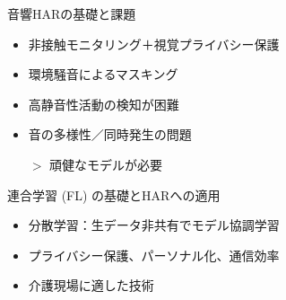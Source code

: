 \documentclass[unicode,12pt,aspectratio=169,dvipdfmx]{beamer}
\begin{document}
\begin{frame}{音響HARの基礎と課題}
  \begin{itemize}
    \item 非接触モニタリング＋視覚プライバシー保護
    \item 環境騒音によるマスキング
    \item 高静音性活動の検知が困難
    \item 音の多様性／同時発生の問題
    
    $>$ 頑健なモデルが必要
  \end{itemize}
\end{frame}
\begin{frame}{連合学習 (FL) の基礎とHARへの適用}
  \begin{itemize}
    \item 分散学習：生データ非共有でモデル協調学習
    \item プライバシー保護、パーソナル化、通信効率
    \item 介護現場に適した技術
  \end{itemize}
\end{frame}
\end{document}
